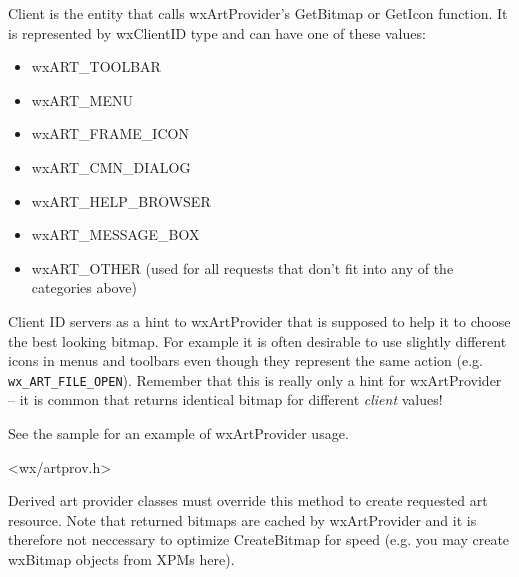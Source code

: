 
Client is the entity that calls wxArtProvider's GetBitmap or GetIcon
function. It is represented by wxClientID type and can have one of these 
values:
\begin{itemize}\itemsep=0pt
\item wxART\_TOOLBAR
\item wxART\_MENU
\item wxART\_FRAME\_ICON
\item wxART\_CMN\_DIALOG
\item wxART\_HELP\_BROWSER
\item wxART\_MESSAGE\_BOX
\item wxART\_OTHER (used for all requests that don't fit into any of the categories above)
\end{itemize}
Client ID servers as a hint to wxArtProvider that is supposed to help it to
choose the best looking bitmap. For example it is often desirable to use
slightly different icons in menus and toolbars even though they represent the
same action (e.g. {\tt wx\_ART\_FILE\_OPEN}). Remember that this is really
only a hint for wxArtProvider -- it is common that
returns identical bitmap for different {\it client} values!


See the  sample for an example of wxArtProvider usage.




<wx/artprov.h>


\label{wxartprovidercreatebitmap}


Derived art provider classes must override this method to create requested 
art resource. Note that returned bitmaps are cached by wxArtProvider and it is therefore
not neccessary to optimize CreateBitmap for speed (e.g. you may create wxBitmap objects
from XPMs here).



